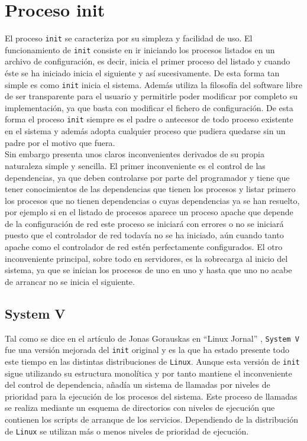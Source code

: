 \section{Proceso init} %
El proceso \texttt{init} se caracteriza por su simpleza y facilidad de uso. El funcionamiento de \texttt{init} consiste en ir iniciando los procesos listados en un archivo de configuración, es decir, inicia el primer proceso del listado y cuando éste se ha iniciado inicia el siguiente y así sucesivamente. De esta forma tan simple es como \texttt{init} inicia el sistema. Además utiliza la filosofía del software libre de ser transparente para el usuario y permitirle poder modificar por completo su implementación, ya que basta con modificar el fichero de configuración. De esta forma el proceso \texttt{init} siempre es el padre o antecesor de todo proceso existente en el sistema y además adopta cualquier proceso que pudiera quedarse sin un padre por el motivo que fuera.\\

Sin embargo presenta unos claros inconvenientes derivados de su propia naturaleza simple y sencilla. El primer inconveniente es el control de las dependencias, ya que deben controlarse por parte del programador y tiene que tener conocimientos de las dependencias que tienen los procesos y listar primero los procesos que no tienen dependencias o cuyas dependencias ya se han resuelto, por ejemplo si en el listado de procesos aparece un proceso apache que depende de la configuración de red este proceso se iniciará con errores o no se iniciará puesto que el controlador de red todavía no se ha iniciado, aún cuando tanto apache como el controlador de red estén perfectamente configurados. El otro inconveniente principal, sobre todo en servidores, es la sobrecarga al inicio del sistema, ya que se inician los procesos de uno en uno y hasta que uno no acabe de arrancar no se inicia el siguiente.

\subsection{System V }
Tal como se dice en el artículo de Jonas Gorauskas en ``Linux Jornal'' \cite{SysV}, \texttt{System V} fue una versión mejorada del \texttt{init} original y es la que ha estado presente todo este tiempo en las distintas distribuciones de \texttt{Linux}. Aunque esta versión de \texttt{init} sigue utilizando su estructura monolítica y por tanto mantiene el inconveniente del control de dependencia, añadía un sistema de llamadas por niveles de prioridad para la ejecución de los procesos del sistema. Este proceso de llamadas se realiza mediante un esquema de directorios con niveles de ejecución  que contienen los scripts de arranque de los servicios. Dependiendo de la distribución de \texttt{Linux} se utilizan más o menos niveles de prioridad de ejecución.
	
